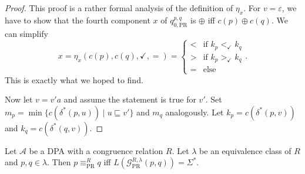 \begin{proof}
	This proof is a rather formal analysis of the definition of $\eta_x$. For $v = \varepsilon$, we have to show that the fourth component $x$ of $q_{0,\text{PR}}^{p,q}$ is $\oplus$ iff $c(p) \oplus c(q)$. We can simplify 
	$$x = \eta_x(c(p), c(q), \checkmark, =) = \begin{cases}
			< & \text{if } k_p <_\checkmark k_q \\
			> & \text{if } k_p >_\checkmark k_q \\
			= & \text{else}
		\end{cases}.$$
	This is exactly what we hoped to find.
	
	Now let $v = v' a$ and assume the statement is true for $v'$. Set $m_p = \min \{ c(\delta^*(p, u)) \mid u \sqsubseteq v' \}$ and $m_q$ analogously. Let $k_p = c(\delta^*(p, v))$ and $k_q = c(\delta^*(q, v))$. %
\end{proof}

\begin{theorem}
	Let $\mathcal{A}$ be a DPA with a congruence relation $R$. Let $\lambda$ be an equivalence class of $R$ and $p, q \in \lambda$. Then $p \equiv_\text{PR}^R q$ iff $L(\mathcal{G}_\text{PR}^{R,\lambda}(p, q)) = \Sigma^*$.
\end{theorem}

